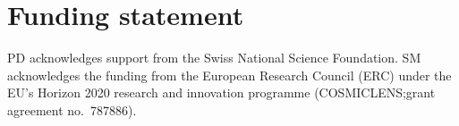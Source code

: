 \clearpage











% 
\section*{Funding statement}
PD acknowledges support from the Swiss National Science Foundation.
SM acknowledges the funding from the European Research Council (ERC)
under the EU’s Horizon 2020 research and innovation programme
(COSMICLENS;\@ grant agreement no.~787886).

% 
%


